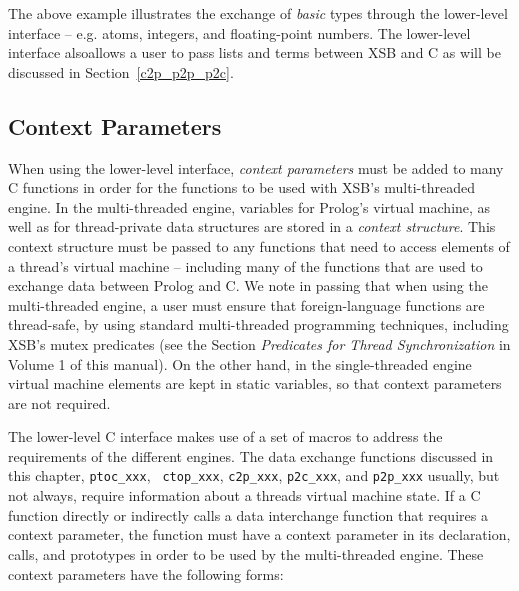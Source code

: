 The above example illustrates the exchange of {\em basic} types
through the lower-level interface -- e.g. atoms, integers, and
floating-point numbers.  The lower-level interface alsoallows a user
to pass lists and terms between XSB and C as will be discussed in
Section~\ref{c2p_p2p_p2c}.

\subsection{Context Parameters} \label{sec:context-parameter}

When using the lower-level interface, {\em context parameters} must be
added to many C functions in order for the functions to be used with
XSB's multi-threaded engine.  In the multi-threaded engine, variables
for Prolog's virtual machine, as well as for thread-private data
structures are stored in a {\em context structure}.  This context
structure must be passed to any functions that need to access elements
of a thread's virtual machine -- including many of the functions that
are used to exchange data between Prolog and C.  We note in passing
that when using the multi-threaded engine, a user must ensure that
foreign-language functions are thread-safe, by using standard
multi-threaded programming techniques, including XSB's mutex
predicates (see the Section {\em Predicates for Thread
  Synchronization} in Volume 1 of this manual).  On the other hand, in
the single-threaded engine virtual machine elements are kept in static
variables, so that context parameters are not required.

The lower-level C interface makes use of a set of macros to address
the requirements of the different engines.  The data exchange
functions discussed in this chapter, {\tt ptoc\_xxx}, {\tt
  ctop\_xxx}, {\tt c2p\_xxx}, {\tt p2c\_xxx},
and {\tt p2p\_xxx} usually, but not always, require
information about a threads virtual machine state.  
%
%
If a C function directly or indirectly calls a data interchange
function that requires a context parameter, the function must have a
context parameter in its declaration, calls, and prototypes in order
to be used by the multi-threaded engine.  These context parameters
have the following forms:

